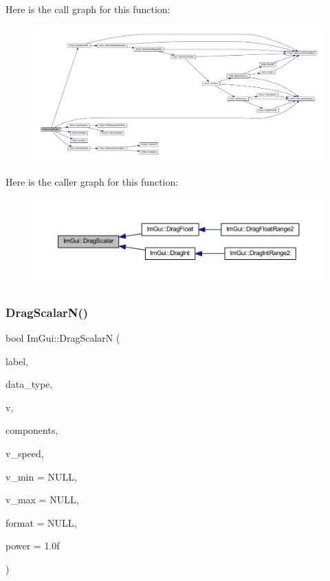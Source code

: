 Here is the call graph for this function\+:
\nopagebreak
\begin{figure}[H]
\begin{center}
\leavevmode
\includegraphics[width=350pt]{namespace_im_gui_a127eccba6a956933f8c0f35b9e55105e_cgraph}
\end{center}
\end{figure}
Here is the caller graph for this function\+:
\nopagebreak
\begin{figure}[H]
\begin{center}
\leavevmode
\includegraphics[width=350pt]{namespace_im_gui_a127eccba6a956933f8c0f35b9e55105e_icgraph}
\end{center}
\end{figure}
\mbox{\label{namespace_im_gui_a8772a7febac2b035d3f2f240f7e7c2e9}} 
\subsubsection{\texorpdfstring{Drag\+Scalar\+N()}{DragScalarN()}}
{\footnotesize\ttfamily bool Im\+Gui\+::\+Drag\+ScalarN (\begin{DoxyParamCaption}\item[{const char $\ast$}]{label,  }\item[{\mbox{\hyperlink{imgui_8h_a4cfa8697a3d76722fff83eb18922e9d5}{Im\+Gui\+Data\+Type}}}]{data\+\_\+type,  }\item[{void $\ast$}]{v,  }\item[{int}]{components,  }\item[{float}]{v\+\_\+speed,  }\item[{const void $\ast$}]{v\+\_\+min = {\ttfamily NULL},  }\item[{const void $\ast$}]{v\+\_\+max = {\ttfamily NULL},  }\item[{const char $\ast$}]{format = {\ttfamily NULL},  }\item[{float}]{power = {\ttfamily 1.0f} }\end{DoxyParamCaption})}

